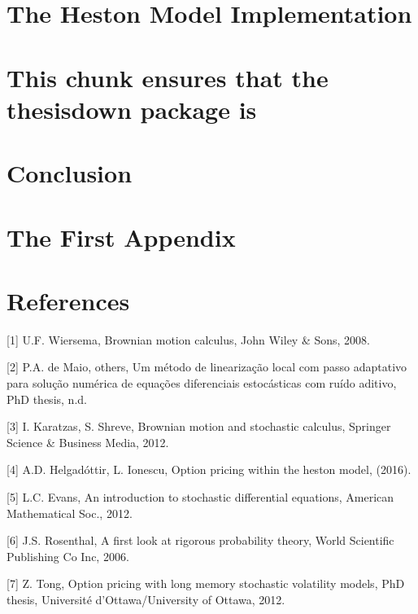 \documentclass[12pt,twoside]{reedthesis}
\theoremstyle{definition}
\theoremstyle{definition}
\theoremstyle{remark}
\begin{document}
  \chapter{The Heston Model
  Implementation}\label{the-heston-model-implementation}
  
  \chapter{This chunk ensures that the thesisdown package
  is}\label{this-chunk-ensures-that-the-thesisdown-package-is}
  
  \chapter{Conclusion}\label{conclusion}
  
  \chapter{The First Appendix}\label{the-first-appendix}
  
  \chapter*{References}\label{references}
  
  \hypertarget{refs}{}
  \hypertarget{ref-ubbo}{}
  {[}1{]} U.F. Wiersema, Brownian motion calculus, John Wiley \& Sons,
  2008.
  
  \hypertarget{ref-maiometodo}{}
  {[}2{]} P.A. de Maio, others, Um método de linearização local com passo
  adaptativo para solução numérica de equações diferenciais estocásticas
  com ruído aditivo, PhD thesis, n.d.
  
  \hypertarget{ref-karatzas2012brownian}{}
  {[}3{]} I. Karatzas, S. Shreve, Brownian motion and stochastic calculus,
  Springer Science \& Business Media, 2012.
  
  \hypertarget{ref-helgadottir2016option}{}
  {[}4{]} A.D. Helgadóttir, L. Ionescu, Option pricing within the heston
  model, (2016).
  
  \hypertarget{ref-evans}{}
  {[}5{]} L.C. Evans, An introduction to stochastic differential
  equations, American Mathematical Soc., 2012.
  
  \hypertarget{ref-rosenthal}{}
  {[}6{]} J.S. Rosenthal, A first look at rigorous probability theory,
  World Scientific Publishing Co Inc, 2006.
  
  \hypertarget{ref-tong2012option}{}
  {[}7{]} Z. Tong, Option pricing with long memory stochastic volatility
  models, PhD thesis, Université d'Ottawa/University of Ottawa, 2012.
  
\end{document}
